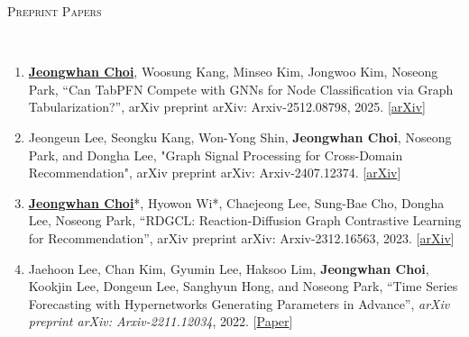 \documentclass[10pt]{article}
\newenvironment{changemargin}[2]{
  \begin{list}{}{
    \setlength{\topsep}{0pt}
    \setlength{\leftmargin}{#1}
    \setlength{\rightmargin}{#2}
    \setlength{\listparindent}{\parindent}
    \setlength{\itemindent}{\parindent}
    \setlength{\parsep}{\parskip}
  }
  \item[]}{\end{list}
}
\newcommand{\lineover}{
	\begin{changemargin}{-0.05in}{-0.05in}
		\vspace*{-8pt}
		\hrulefill \\
		\vspace*{-2pt}
	\end{changemargin}
}
\newcommand{\textbu}[1]{\underline{\textbf{#1}}}
\newenvironment{body} {
	\vspace*{-16pt}
	\begin{changemargin}{-0.25in}{-0.5in}
  }
	{\end{changemargin}
}
\begin{document}
\begin{body}
\vspace{1em}
\textsc{Preprint Papers}
\lineover
\begin{enumerate}
    \item \textbu{Jeongwhan Choi}, Woosung Kang, Minseo Kim, Jongwoo Kim, Noseong Park, ``Can TabPFN Compete with GNNs for Node Classification via Graph Tabularization?'', arXiv preprint arXiv: Arxiv-2512.08798, 2025. [\href{https://arxiv.org/abs/2512.08798}{arXiv}]
    \item Jeongeun Lee, Seongku Kang, Won-Yong Shin, \textbf{Jeongwhan Choi}, Noseong Park, and Dongha Lee, "Graph Signal Processing for Cross-Domain Recommendation", arXiv preprint arXiv: Arxiv-2407.12374. [\href{https://arxiv.org/abs/2407.12374}{arXiv}]
    \item \textbu{Jeongwhan Choi}*, Hyowon Wi*, Chaejeong Lee, Sung-Bae Cho, Dongha Lee, Noseong Park, ``RDGCL: Reaction-Diffusion Graph Contrastive Learning for Recommendation'',  arXiv preprint arXiv: Arxiv-2312.16563, 2023. [\href{https://arxiv.org/abs/2312.16563}{arXiv}]
    \item Jaehoon Lee, Chan Kim, Gyumin Lee, Haksoo Lim, \textbf{Jeongwhan Choi}, Kookjin Lee, Dongeun Lee, Sanghyun Hong, and Noseong Park, ``Time Series Forecasting with Hypernetworks Generating Parameters in Advance'', \emph{arXiv preprint arXiv: Arxiv-2211.12034}, 2022. [\href{https://arxiv.org/abs/2211.12034}{Paper}]
\end{enumerate}
\end{body}
\end{document}
